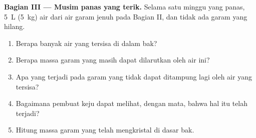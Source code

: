 \begin{problem}
\medskip
\noindent\textbf{Bagian III --- Musim panas yang terik.}
Selama satu minggu yang panas, \qty{5}{L} (\qty{5}{kg}) air  dari
air garam jenuh pada Bagian II, dan tidak ada garam yang hilang.
\begin{enumerate}[resume]
  \item Berapa banyak air yang tersisa di dalam bak?
  \item Berapa massa garam yang masih dapat dilarutkan oleh air ini?
  \item Apa yang terjadi pada garam yang tidak dapat ditampung lagi oleh
        air yang tersisa?
  \item Bagaimana pembuat keju dapat melihat, dengan mata, bahwa hal itu
        telah terjadi?
  \item Hitung massa garam yang telah mengkristal di dasar bak.
\end{enumerate}
\end{problem}
